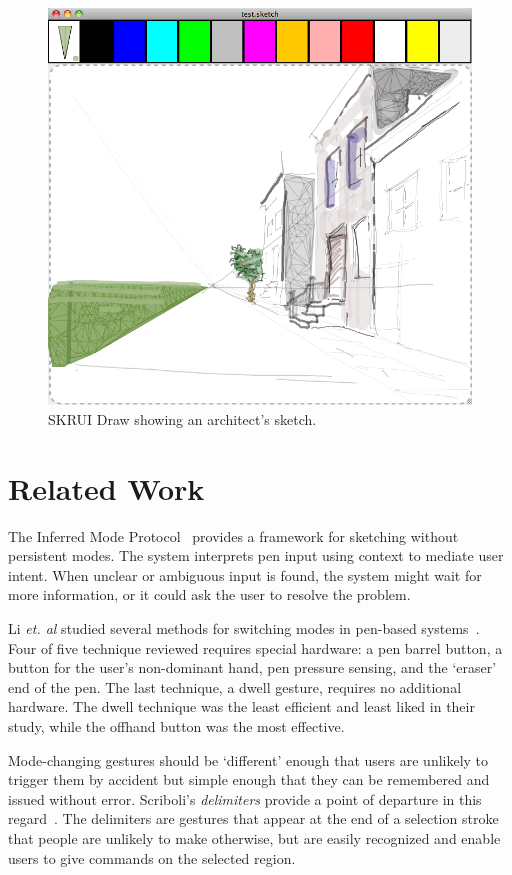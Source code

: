 \documentclass{egpubl}
\begin{document}
\begin{figure}[htb]
  \label{fig:skrui-draw}
  \centering
  \includegraphics[width=.9\linewidth]{img/shaun.png}
  \caption{SKRUI Draw showing an architect's sketch.}
\end{figure}

\section{Related Work}

The Inferred Mode Protocol~\cite{saund-inferred-mode} provides a
framework for sketching without persistent modes. The system
interprets pen input using context to mediate user intent. When
unclear or ambiguous input is found, the system might wait for more
information, or it could ask the user to resolve the problem.

Li \textit{et. al} studied several methods for switching modes in
pen-based systems~\cite{li-mode-switching}. Four of five technique
reviewed requires special hardware: a pen barrel button, a button for
the user's non-dominant hand, pen pressure sensing, and the `eraser'
end of the pen. The last technique, a dwell gesture, requires no
additional hardware. The dwell technique was the least efficient and
least liked in their study, while the offhand button was the most
effective.

Mode-changing gestures should be `different' enough that users are
unlikely to trigger them by accident but simple enough that they can
be remembered and issued without error. Scriboli's \emph{delimiters}
provide a point of departure in this
regard~\cite{hinckley-scriboli}. The delimiters are gestures that
appear at the end of a selection stroke that people are unlikely to
make otherwise, but are easily recognized and enable users to give
commands on the selected region.
\end{document}

